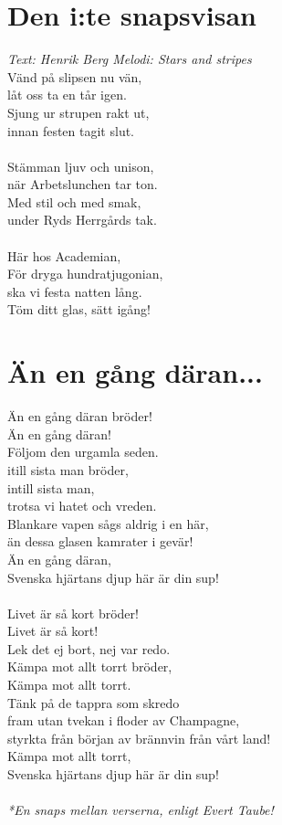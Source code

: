 \section{Den i:te snapsvisan}
\textit{Text: Henrik Berg \hspace{5mm} Melodi: Stars and stripes}
\vspace{2mm}\\
Vänd på slipsen nu vän,\\
låt oss ta en tår igen.\\
Sjung ur strupen rakt ut,\\
innan festen tagit slut.\\
\\
Stämman ljuv och unison,\\
när Arbetslunchen tar ton.\\
Med stil och med smak,\\
under Ryds Herrgårds tak.\\
\\
Här hos Academian,\\
För dryga hundratjugonian,\\
ska vi festa natten lång.\\
Töm ditt glas, sätt igång!

\section{Än en gång däran...}
Än en gång däran bröder!\\
Än en gång däran!\\
Följom den urgamla seden.\\
itill sista man bröder,\\
intill sista man,\\
trotsa vi hatet och vreden.\\
Blankare vapen sågs aldrig i en här,\\
än dessa glasen kamrater i gevär!\\
Än en gång däran,\\
Svenska hjärtans djup här är din sup!\\
\*\\
Livet är så kort bröder!\\
Livet är så kort!\\
Lek det ej bort, nej var redo.\\
Kämpa mot allt torrt bröder,\\
Kämpa mot allt torrt.\\
Tänk på de tappra som skredo\\
fram utan tvekan i floder av Champagne,\\
styrkta från början av brännvin från vårt land!\\
Kämpa mot allt torrt,\\
Svenska hjärtans djup här är din sup!\\
\vspace{\fill}
\\
\textit{*En snaps mellan verserna, enligt Evert Taube!}
